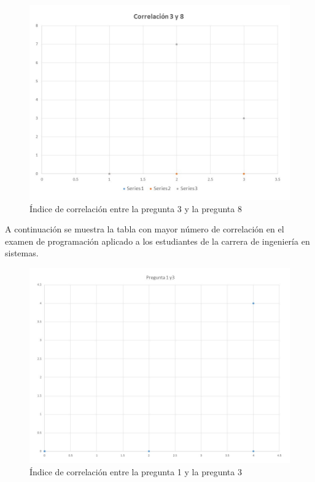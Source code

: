 \documentclass[12pt] {report}
\begin{document}
\begin{figure}[H]
\centering 
\includegraphics[scale=.7]{correlaci_n_38.jpg}
\caption{Índice de correlación entre la pregunta 3 y la pregunta 8}
\end{figure}
A continuación se muestra la tabla con mayor número de correlación en el examen de programación aplicado a los estudiantes de la carrera de ingeniería en sistemas.\\

\begin{figure}[H]
\centering 
\includegraphics[scale=.7]{PCorrelacion1.jpg}
\caption{Índice de correlación entre la pregunta 1 y la pregunta 3}
\end{figure}
\end{document}
